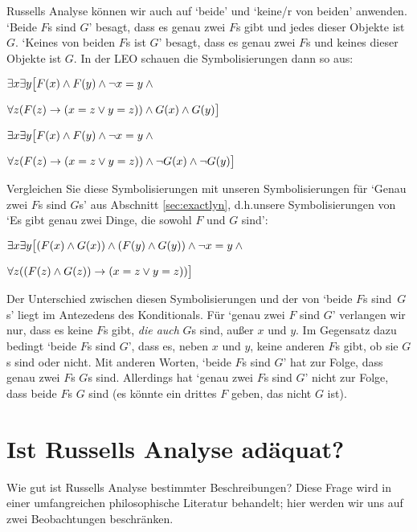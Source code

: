 Russells Analyse können wir auch auf `beide' und `keine/r von beiden' anwenden.  `Beide $F$s sind $G$' besagt, dass es genau zwei $F$s gibt und jedes dieser Objekte ist $G$. `Keines von beiden $F$s ist $G$' besagt, dass es genau zwei $F$s und keines dieser Objekte ist $G$. In der LEO schauen die Symbolisierungen dann so aus:
\begin{earg}
	\item[] $\exists x\exists y\bigl[\mathord{F}(x) \wedge \mathord{F}(y) \wedge \neg x=y \wedge {}$
	\item[]\qquad$\forall z(\mathord{F}(z) \rightarrow (x = z \lor y = z)) \wedge \mathord{G}(x) \wedge \mathord{G}(y)\bigr]$
	\item[] $\exists x\exists y\bigl[\mathord{F}(x) \wedge \mathord{F}(y) \wedge \neg x=y \wedge  {}$
	\item[]\qquad$\forall z(\mathord{F}(z) \rightarrow (x = z \lor y = z)) \wedge \neg \mathord{G}(x) \wedge \neg \mathord{G}(y)\bigr]$
\end{earg}
Vergleichen Sie diese Symbolisierungen mit unseren Symbolisierungen für `Genau zwei $F$s sind $G$s' aus Abschnitt \ref{sec:exactlyn}, d.h.\@ unsere Symbolisierungen von `Es gibt genau zwei Dinge, die sowohl $F$ und $G$ sind':
\begin{earg}
	\item[] $\exists x\exists y\bigl[(\mathord{F}(x) \wedge \mathord{G}(x)) \wedge (\mathord{F}(y) \wedge \mathord{G}(y)) \wedge \neg x=y \wedge {}$
	\item[]\qquad$\forall z((\mathord{F}(z) \wedge \mathord{G}(z)) \rightarrow (x = z \lor y = z))\bigr]$
\end{earg}
Der Unterschied zwischen diesen Symbolisierungen und der von `beide $F$s sind~$G$s' liegt im Antezedens des Konditionals. Für `genau zwei $F$ sind $G$' verlangen wir nur, dass es keine $F$s gibt, \emph{die auch} $G$s sind, au{\ss}er $x$ und $y$. Im Gegensatz dazu bedingt `beide $F$s sind $G$', dass es, neben $x$ und $y$, keine anderen $F$s gibt, ob sie $G$s sind oder nicht. Mit anderen Worten, `beide $F$s sind $G$' hat zur Folge, dass genau zwei $F$s $G$s sind. Allerdings hat `genau zwei $F$s sind $G$' nicht zur Folge, dass beide $F$s $G$ sind (es könnte ein drittes $F$ geben, das nicht $G$ ist).

\section{Ist Russells Analyse adäquat?}
Wie gut ist Russells Analyse bestimmter Beschreibungen? Diese Frage wird in einer umfangreichen philosophische Literatur behandelt; hier werden wir uns auf zwei Beobachtungen beschränken.

